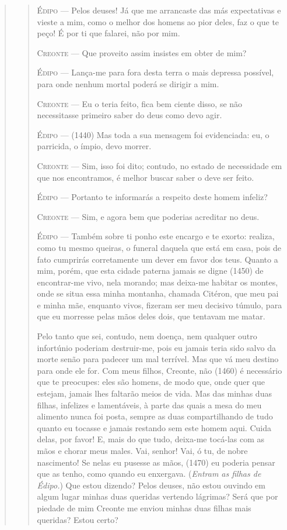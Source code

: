 \begin{verse}
\begin{verse}
\textsc{Édipo} --- Pelos deuses! Já que me arrancaste das más expectativas e vieste a mim,
como o melhor dos homens ao pior deles, faz o que te peço! É por ti que
falarei, não por mim.

\textsc{Creonte} --- Que proveito assim insistes em obter de mim?

\textsc{Édipo} --- Lança-me para fora desta terra o mais depressa possível, para onde
nenhum mortal poderá se dirigir a mim.

\textsc{Creonte} --- Eu o teria feito, fica bem ciente disso, se não necessitasse primeiro
saber do deus como devo agir.

\textsc{Édipo} --- (1440) Mas toda a sua mensagem foi evidenciada: eu, o parricida, o
ímpio, devo morrer.

\textsc{Creonte} --- Sim, isso foi dito; contudo, no estado de necessidade em que nos
encontramos, é melhor buscar saber o deve ser feito.

\textsc{Édipo} --- Portanto te informarás a respeito deste homem infeliz?

\textsc{Creonte} --- Sim, e agora bem que poderias acreditar no deus.

\textsc{Édipo} --- Também sobre ti ponho este encargo e te exorto: realiza, como tu mesmo
queiras, o funeral daquela que está em casa, pois de fato cumprirás
corretamente um dever em favor dos teus. Quanto a mim, porém, que esta
cidade paterna jamais se digne (1450) de encontrar-me vivo, nela
morando; mas deixa-me habitar os montes, onde se situa essa minha
montanha, chamada Citéron, que meu pai e minha mãe, enquanto vivos,
fizeram ser meu decisivo túmulo, para que eu morresse pelas mãos deles
dois, que tentavam me matar.

Pelo tanto que sei, contudo, nem doença, nem qualquer outro infortúnio
poderiam destruir-me, pois eu jamais teria sido salvo da morte senão
para padecer um mal terrível. Mas que vá meu destino para onde ele for.
Com meus filhos, Creonte, não (1460) é necessário que te preocupes: eles
são homens, de modo que, onde quer que estejam, jamais lhes faltarão
meios de vida. Mas das minhas duas filhas, infelizes e lamentáveis, à
parte das quais a mesa do meu alimento nunca foi posta, sempre as duas
compartilhando de tudo quanto eu tocasse e jamais restando sem este
homem aqui. Cuida delas, por favor! E, mais do que tudo, deixa-me
tocá-las com as mãos e chorar meus males. Vai, senhor! Vai, ó tu, de
nobre nascimento! Se nelas eu pusesse as mãos, (1470) eu poderia pensar
que as tenho, como quando eu enxergava. (\emph{Entram as filhas de
Édipo.}) Que estou dizendo? Pelos deuses, não estou ouvindo em algum
lugar minhas duas queridas vertendo lágrimas? Será que por piedade de
mim Creonte me enviou minhas duas filhas mais queridas? Estou certo?


\end{verse}
\end{verse}
